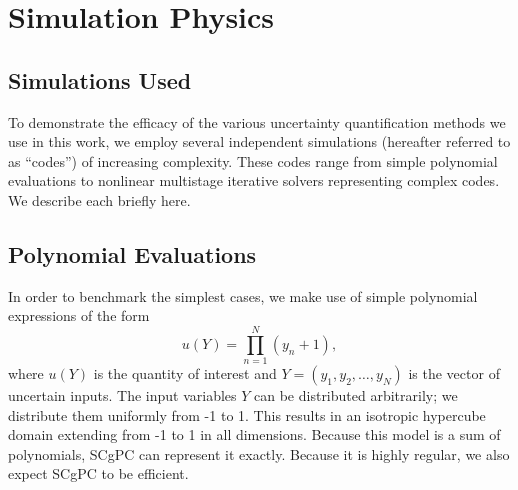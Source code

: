 
\chapter{Simulation Physics} %

\label{ch:models} %



\section{Simulations Used}
To demonstrate the efficacy of the various uncertainty quantification methods we use in this work, we employ
several independent simulations (hereafter referred to as ``codes'') of increasing complexity.  These codes
range from simple polynomial evaluations to nonlinear multistage
iterative solvers representing complex codes.  We describe each briefly here.


\section{Polynomial Evaluations}
In order to benchmark the simplest cases, we make use of simple polynomial expressions of the form
\begin{equation}
  u(Y) = \prod_{n=1}^N (y_n+1),
\end{equation}
where $u(Y)$ is the quantity of interest and $Y=(y_1,y_2,\ldots,y_N)$ is the vector of uncertain inputs.
The input variables $Y$ can be distributed arbitrarily; we distribute them uniformly from -1 to 1.  This
results in an isotropic hypercube domain extending from -1 to 1 in all dimensions.  
Because this model is a sum of polynomials, SCgPC can represent it exactly.  Because it is highly regular, we
also expect SCgPC to be efficient.





